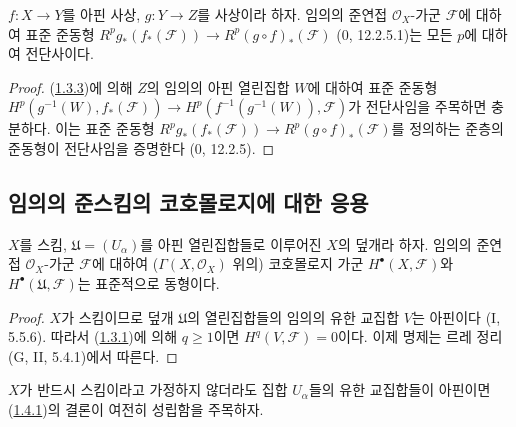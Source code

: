 \begin{corollary}[1.3.4]
\label{III.1.3.4-fr}
$f:X\to Y$를 아핀 사상, $g:Y\to Z$를 사상이라 하자.
임의의 준연접 $\mathcal O_X$-가군 $\mathcal F$에 대하여 표준 준동형
$R^pg_*(f_*(\mathcal F))\to R^p(g\circ f)_*(\mathcal F)$ (0, 12.2.5.1)는
모든 $p$에 대하여 전단사이다.
\end{corollary}

\begin{proof}
(\hyperref[III.1.3.3-fr]{1.3.3})에 의해 $Z$의 임의의 아핀 열린집합
$W$에 대하여 표준 준동형
$H^p(g^{-1}(W),f_*(\mathcal F))\to
H^p(f^{-1}(g^{-1}(W)),\mathcal F)$가 전단사임을 주목하면 충분하다.
이는 표준 준동형
$R^pg_*(f_*(\mathcal F))\to R^p(g\circ f)_*(\mathcal F)$를 정의하는
준층의 준동형이 전단사임을 증명한다 (0, 12.2.5).
\end{proof}

\subsection{임의의 준스킴의 코호몰로지에 대한 응용}
\label{subsection:III.1.4-fr}

\begin{proposition}[1.4.1]
\label{III.1.4.1-fr}
$X$를 스킴, $\mathfrak U=(U_\alpha)$를 아핀 열린집합들로 이루어진
$X$의 덮개라 하자. 임의의 준연접 $\mathcal O_X$-가군 $\mathcal F$에
대하여 ($\Gamma(X,\mathcal O_X)$ 위의) 코호몰로지 가군
$H^\bullet(X,\mathcal F)$와 $H^\bullet(\mathfrak U,\mathcal F)$는
표준적으로 동형이다.
\end{proposition}

\begin{proof}
$X$가 스킴이므로 덮개 $\mathfrak U$의 열린집합들의 임의의 유한 교집합
$V$는 아핀이다 (I, 5.5.6). 따라서
(\hyperref[III.1.3.1-fr]{1.3.1})에 의해 $q\geq1$이면
$H^q(V,\mathcal F)=0$이다. 이제 명제는 르레 정리 (G, II, 5.4.1)에서
따른다.
\end{proof}

\begin{remark}[1.4.2]
\label{III.1.4.2-fr}
$X$가 반드시 스킴이라고 가정하지 않더라도 집합 $U_\alpha$들의 유한
교집합들이 아핀이면 (\hyperref[III.1.4.1-fr]{1.4.1})의 결론이 여전히
성립함을 주목하자.
\end{remark}

